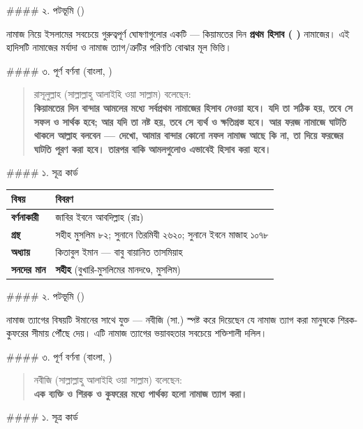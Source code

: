 \#\#\#\# ২. পটভূমি ()

নামাজ নিয়ে ইসলামের সবচেয়ে গুরুত্বপূর্ণ ঘোষণাগুলোর একটি — কিয়ামতের দিন \textbf{প্রথম হিসাব ( )} নামাজের। এই হাদিসটি নামাজের মর্যাদা ও নামাজ ত্যাগ/ত্রুটির পরিণতি বোঝার মূল ভিত্তি।

\#\#\#\# ৩. পূর্ণ বর্ণনা (বাংলা, )

\begin{quote}
রাসূলুল্লাহ (সাল্লাল্লাহু আলাইহি ওয়া সাল্লাম) বলেছেন: \\
\textbf{কিয়ামতের দিন বান্দার আমলের মধ্যে সর্বপ্রথম নামাজের হিসাব নেওয়া হবে। যদি তা সঠিক হয়, তবে সে সফল ও সার্থক হবে; আর যদি তা নষ্ট হয়, তবে সে ব্যর্থ ও ক্ষতিগ্রস্ত হবে। আর ফরজ নামাজে ঘাটতি থাকলে আল্লাহ বলবেন — দেখো, আমার বান্দার কোনো নফল নামাজ আছে কি না, তা দিয়ে ফরজের ঘাটতি পূরণ করা হবে। তারপর বাকি আমলগুলোও এভাবেই হিসাব করা হবে।}
\end{quote}

\#\#\#\# ১. সূত্র কার্ড

\begin{table}[h]\centering\small
\begin{tabular}{ll}
বিষয় & বিবরণ \\
\hline
\textbf{বর্ণনাকারী} & জাবির ইবনে আবদিল্লাহ (রাঃ) \\
\textbf{গ্রন্থ} & সহীহ মুসলিম ৮২; সুনানে তিরমিযী ২৬২০; সুনানে ইবনে মাজাহ ১০৭৮ \\
\textbf{অধ্যায়} & কিতাবুল ইমান — বাবু বায়ানিত তাসমিয়াহ \\
\textbf{সনদের মান} & \textbf{সহীহ} (বুখারি-মুসলিমের মানদণ্ডে, মুসলিম) \\
\hline
\end{tabular}
\end{table}

\#\#\#\# ২. পটভূমি ()

নামাজ ত্যাগের বিষয়টি ঈমানের সাথে যুক্ত — নবীজি (সা.) স্পষ্ট করে দিয়েছেন যে নামাজ ত্যাগ করা মানুষকে শিরক-কুফরের সীমায় পৌঁছে দেয়। এটি নামাজ ত্যাগের ভয়াবহতার সবচেয়ে শক্তিশালী দলিল।

\#\#\#\# ৩. পূর্ণ বর্ণনা (বাংলা, )

\begin{quote}
নবীজি (সাল্লাল্লাহু আলাইহি ওয়া সাল্লাম) বলেছেন: \\
\textbf{এক ব্যক্তি ও শিরক ও কুফরের মধ্যে পার্থক্য হলো নামাজ ত্যাগ করা।}
\end{quote}

\#\#\#\# ১. সূত্র কার্ড

